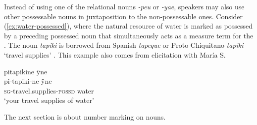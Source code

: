 
Instead of using one of the relational nouns \textit{-peu} or \textit{-yae}, speakers may also use other possessable nouns in juxtaposition to the non-possessable ones. Consider (\ref{ex:water-possessed}), where the natural resource of water is marked as possessed by a preceding possessed noun that simultaneously acts as a measure term for the . The noun \textit{tapiki} is borrowed from Spanish \textit{tapeque} or Proto-Chiquitano \textit{tapiki} ‘travel supplies’ \citep[cf.][9]{Nikulin2019}. This example also comes from elicitation with María S.

\ea\label{ex:water-possessed}
\begingl 
\glpreamble pitapikine ÿne\\
\gla pi-tapiki-ne ÿne\\ 
\textsc{sg}-travel.supplies-\textsc{possd} water\\ 
\glft ‘your travel supplies of water’\\ 
\endgl
\trailingcitation{[rxx-e181018le]}
\xe



The next section is about number marking on nouns.

